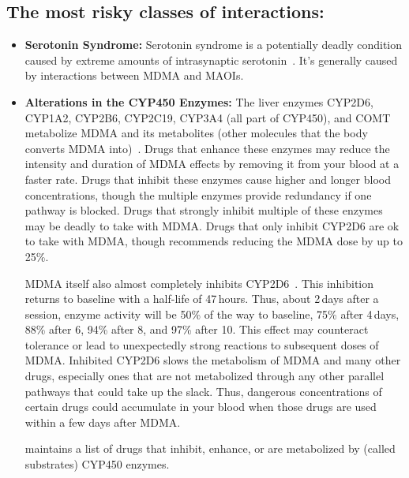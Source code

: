 \documentclass[11pt,oneside]{book}
\let\cite\parencite
\begin{document}
\subsection*{The most risky classes of interactions:}
\begin{itemize}
    \item \textbf{Serotonin Syndrome:} Serotonin syndrome is a potentially deadly condition caused by extreme amounts of intrasynaptic serotonin~\cite{malcolmSerotonin,sarparastDrugInteractions}. It's generally caused by interactions between MDMA and MAOIs.
    \item \textbf{Alterations in the CYP450 Enzymes:} The liver enzymes CYP2D6, CYP1A2, CYP2B6, CYP2C19, CYP3A4 (all part of CYP450), and COMT metabolize MDMA and its metabolites (other molecules that the body converts MDMA into)~\cite{sarparastDrugInteractions}. Drugs that enhance these enzymes may reduce the intensity and duration of MDMA effects by removing it from your blood at a faster rate. Drugs that inhibit these enzymes cause higher and longer blood concentrations, though the multiple enzymes provide redundancy if one pathway is blocked. Drugs that strongly inhibit multiple of these enzymes may be deadly to take with MDMA. Drugs that only inhibit CYP2D6 are ok to take with MDMA, though \textcite{liechtiInteractions} recommends reducing the MDMA dose by up to 25\%.

    MDMA itself also almost completely inhibits CYP2D6~\cite{omathunaCYP}. This inhibition returns to baseline with a half-life of 47\,hours. Thus, about 2\,days after a session, enzyme activity will be 50\% of the way to baseline, 75\% after 4\,days, 88\% after 6, 94\% after 8, and 97\% after 10. This effect may counteract tolerance or lead to unexpectedly strong reactions to subsequent doses of MDMA. Inhibited CYP2D6 slows the metabolism of MDMA and many other drugs, especially ones that are not metabolized through any other parallel pathways that could take up the slack. Thus, dangerous concentrations of certain drugs could accumulate in your blood when those drugs are used within a few days after MDMA.

    \textcite{flockartTable} maintains a list of drugs that inhibit, enhance, or are metabolized by (called substrates) CYP450 enzymes.
\end{itemize}
\end{document}
